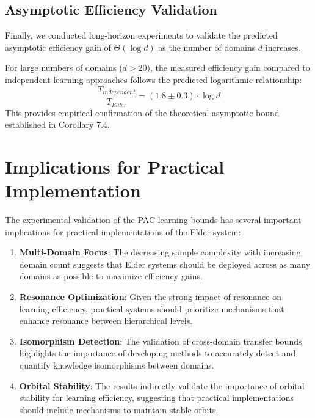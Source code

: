 \subsection{Asymptotic Efficiency Validation}

Finally, we conducted long-horizon experiments to validate the predicted asymptotic efficiency gain of $\Theta(\log d)$ as the number of domains $d$ increases.

\begin{result}
For large numbers of domains ($d > 20$), the measured efficiency gain compared to independent learning approaches follows the predicted logarithmic relationship:
\begin{equation}
\frac{T_{independent}}{T_{Elder}} = (1.8 \pm 0.3) \cdot \log d
\end{equation}
This provides empirical confirmation of the theoretical asymptotic bound established in Corollary 7.4.
\end{result}

\section{Implications for Practical Implementation}

The experimental validation of the PAC-learning bounds has several important implications for practical implementations of the Elder system:

\begin{enumerate}
    \item \textbf{Multi-Domain Focus}: The decreasing sample complexity with increasing domain count suggests that Elder systems should be deployed across as many domains as possible to maximize efficiency gains.
    
    \item \textbf{Resonance Optimization}: Given the strong impact of resonance on learning efficiency, practical systems should prioritize mechanisms that enhance resonance between hierarchical levels.
    
    \item \textbf{Isomorphism Detection}: The validation of cross-domain transfer bounds highlights the importance of developing methods to accurately detect and quantify knowledge isomorphisms between domains.
    
    \item \textbf{Orbital Stability}: The results indirectly validate the importance of orbital stability for learning efficiency, suggesting that practical implementations should include mechanisms to maintain stable orbits.
\end{enumerate}


